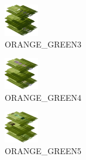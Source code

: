 \hspace{0.1cm}
\begin{minipage}[b]{0.15\linewidth}
\begin{figure}[H]                                                          
  \centering                                                             
  \begin{adjustbox}{width=1.5cm,center}                                   
  \includegraphics[width=1.5cm]{src/colorspace_colourflow/flows/colourflow_227-45.png}%
  \end{adjustbox}                                                        
\caption*{ORANGE\_GREEN3}                                           
\end{figure}                                                               
\end{minipage}
\hspace{0.1cm}
\begin{minipage}[b]{0.15\linewidth}
\begin{figure}[H]                                                          
  \centering                                                             
  \begin{adjustbox}{width=1.5cm,center}                                   
  \includegraphics[width=1.5cm]{src/colorspace_colourflow/flows/colourflow_228-45.png}%
  \end{adjustbox}                                                        
\caption*{ORANGE\_GREEN4}                                           
\end{figure}                                                               
\end{minipage}
\hspace{0.1cm}
\begin{minipage}[b]{0.15\linewidth}
\begin{figure}[H]                                                          
  \centering                                                             
  \begin{adjustbox}{width=1.5cm,center}                                   
  \includegraphics[width=1.5cm]{src/colorspace_colourflow/flows/colourflow_229-45.png}%
  \end{adjustbox}                                                        
\caption*{ORANGE\_GREEN5}                                           
\end{figure}                                                               
\end{minipage}
